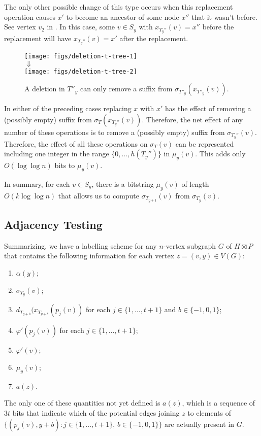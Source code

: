 \documentclass[kpfonts]{patmorin}
\begin{document}
The only other possible change of this type occurs when this replacement operation causes $x'$ to become an ancestor of some node $x''$ that it wasn't before.  See vertex $v_2$ in .  In this case, some $v\in S_y$ with $x_{T_y''}(v)=x''$ before the replacement will have $x_{T_y''}(v)=x'$ after the replacement.

\begin{figure}
  \begin{center}
    \texttt{[image: figs/deletion-t-tree-1]} \\[1ex]
    $\Downarrow$ \\[1ex]
    \texttt{[image: figs/deletion-t-tree-2]}
  \end{center}
  \caption{A deletion in $T''_y$ can only remove a suffix from $\sigma_{T''_y}(x_{T''_y}(v))$.}
\end{figure}

In either of the preceding cases replacing $x$ with $x'$ has the effect of removing a (possibly empty) suffix from $\sigma_T(x_{T_y''}(v))$.  Therefore, the net effect of any number of these operations is to remove a (possibly empty) suffix from $\sigma_{T_y''}(v)$.  Therefore, the effect of all these operations on $\sigma_T(v)$ can be represented including one integer in the range $\{0,\ldots,h(T_y'')\}$ in $\mu_y(v)$.  This adds only $O(\log\log n)$ bits to $\mu_y(v)$.

In summary, for each $v\in S_y$, there is a bitstring $\mu_y(v)$ of length $O(k\log\log n)$ that allows us to compute $\sigma_{T_{y+1}}(v)$ from $\sigma_{T_y}(v)$.


\subsection{Adjacency Testing}

Summarizing, we have a labelling scheme for any $n$-vertex subgraph $G$ of $H\boxtimes P$ that contains the following information for each vertex $z=(v,y)\in V(G)$:

\begin{enumerate}[(PC1)]
  \item $\alpha(y)$; %
  \item $\sigma_{T_y}(v)$; %
  \item $d_{T_{y+b}}(x_{T_{y+b}}(p_j(v))$ for each $j\in\{1,\ldots,t+1\}$ and $b\in\{-1,0,1\}$; 
  \item $\varphi'(p_j(v))$ for each $j\in\{1,\ldots,t+1\}$;
  \item $\varphi'(v)$;
  \item $\mu_y(v)$;
  \item $a(z)$.
\end{enumerate}
The only one of these quantities not yet defined is $a(z)$, which is a sequence of $3t$ bits that indicate which of the potential edges joining $z$ to elements of $\{(p_j(v),y+b): j\in\{1,\ldots,t+1\},\, b\in\{-1,0,1\}\}$ are actually present in $G$.
\end{document}
